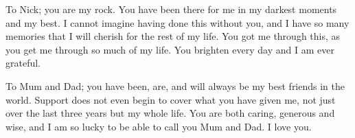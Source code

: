 \bigskip

\noindent To Nick;  you are my rock. You have been there for me in my darkest moments and my best.  I cannot imagine having done this without you, and I have so many memories that I will cherish for the rest of my life.  You got me through this, as you get me through so much of my life.  You brighten every day and I am ever grateful.

\bigskip

\noindent To Mum and Dad;  you have been, are, and will always be my best friends in the world.  Support does not even begin to cover what you have given me, not just over the last three years but my whole life.  You are both caring, generous and wise, and I am so lucky to be able to call you Mum and Dad.  I love you.   




%
%

